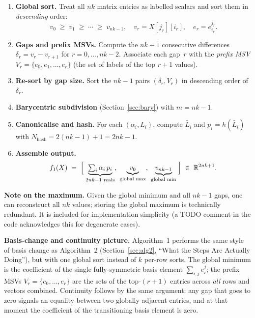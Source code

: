 \documentclass[11pt,a4paper]{article}
\newcommand{\eji}[2]{e^{#1}_{#2}}           %
\newcommand{\hash}[1]{h\!\left(#1\right)}   %
\newcommand{\canon}[1]{\widetilde{#1}}      %
\newcommand{\R}{\mathbb{R}}
\begin{document}
\begin{enumerate}[leftmargin=*]
  \item \textbf{Global sort.}  Treat all $nk$ matrix entries as labelled
        scalars and sort them in \emph{descending} order:
        \[
          v_0 \;\ge\; v_1 \;\ge\; \cdots \;\ge\; v_{nk-1},
          \quad v_r = X[j_r][i_r], \quad e_r = \eji{j_r}{i_r}.
        \]

  \item \textbf{Gaps and prefix MSVs.}  Compute the $nk-1$ consecutive
        differences $\delta_r = v_r - v_{r+1}$ for $r = 0,\ldots,nk-2$.
        Associate each gap~$r$ with the \emph{prefix MSV}
        $V_r = \{e_0, e_1, \ldots, e_r\}$ (the set of labels of the top
        $r{+}1$ values).

  \item \textbf{Re-sort by gap size.}  Sort the $nk-1$ pairs
        $(\delta_r, V_r)$ in descending order of $\delta_r$.

  \item \textbf{Barycentric subdivision} (Section~\ref{sec:bary}) with
        $m = nk-1$.

  \item \textbf{Canonicalise and hash.}  For each $(\alpha_i, L_i)$,
        compute $\canon{L_i}$ and $p_i = \hash{\canon{L_i}}$ with
        $N_{\text{hash}} = 2(nk-1)+1 = 2nk-1$.

  \item \textbf{Assemble output.}
        \[
          f_1(X) \;=\; \Bigl[\;\underbrace{\textstyle\sum_i \alpha_i\,p_i}_{2nk-1\text{ reals}},\;
                               \underbrace{v_0}_{\text{global max}},\;
                               \underbrace{v_{nk-1}}_{\text{global min}}\;\Bigr]
          \;\in\; \R^{2nk+1}.
        \]
\end{enumerate}

\begin{tcolorbox}[notebox]
\textbf{Note on the maximum.}  Given the global minimum and all $nk-1$ gaps,
one can reconstruct all $nk$ values; storing the global maximum is technically
redundant.  It is included for implementation simplicity (a TODO comment in the
code acknowledges this for degenerate cases).
\end{tcolorbox}

\textbf{Basis-change and continuity picture.}
Algorithm~1 performs the same style of basis change as Algorithm~2
(Section~\ref{sec:alg2}, ``What the Steps Are Actually Doing''), but with one
global sort instead of $k$ per-row sorts.  The global minimum is the coefficient
of the single fully-symmetric basis element $\sum_{i,j}\eji{j}{i}$; the prefix
MSVs $V_r = \{e_0,\ldots,e_r\}$ are the sets of the top-$(r{+}1)$ entries
across \emph{all} rows and vectors combined.  Continuity follows by the same
argument: any gap that goes to zero signals an equality between two globally
adjacent entries, and at that moment the coefficient of the transitioning basis
element is zero.
\end{document}
